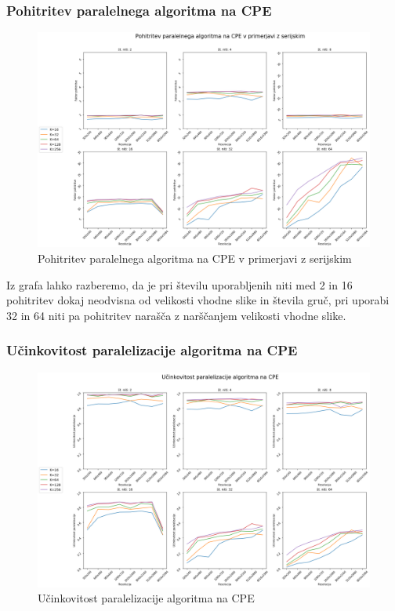 \documentclass[11pt]{article}
\begin{document}
\subsubsection{Pohitritev paralelnega algoritma na CPE}
\begin{figure}[H]
    \label{img:cpup_perf}
    \centering
    \includegraphics[scale=0.28]{cpup_perf.png}
    \caption{Pohitritev paralelnega algoritma na CPE v primerjavi z serijskim}
\end{figure}

Iz grafa lahko razberemo, da je pri številu uporabljenih niti med 2 in 16 pohitritev dokaj neodvisna od velikosti vhodne slike in števila gruč,
pri uporabi 32 in 64 niti pa pohitritev narašča z narščanjem velikosti vhodne slike.

\subsubsection{Učinkovitost paralelizacije algoritma na CPE}
\begin{figure}[H]
    \label{img:cpup_eff}
    \centering
    \includegraphics[scale=0.28]{cpup_eff.png}
    \caption{Učinkovitost paralelizacije algoritma na CPE}
\end{figure}
\end{document}
